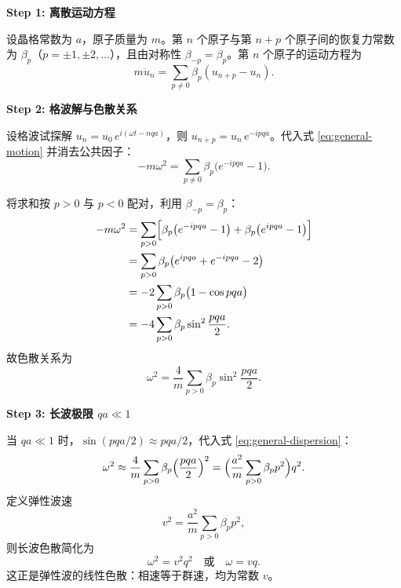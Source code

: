\begin{derivationbox}[标准解题过程]
\textbf{Step 1: 离散运动方程}

设晶格常数为 $a$，原子质量为 $m$。第 $n$ 个原子与第 $n+p$ 个原子间的恢复力常数为 $\beta_p$（$p=\pm1,\pm2,\dots$），且由对称性 $\beta_{-p}=\beta_p$。第 $n$ 个原子的运动方程为
\begin{equation}
m\ddot u_n = \sum_{p\neq0}\beta_p(u_{n+p}-u_n).
\label{eq:general-motion}
\end{equation}

\textbf{Step 2: 格波解与色散关系}

设格波试探解 $u_n=u_0\,e^{i(\omega t-nqa)}$，则 $u_{n+p}=u_n\,e^{-ipqa}$。代入式 \eqref{eq:general-motion} 并消去公共因子：
\begin{equation}
-m\omega^2 = \sum_{p\neq0}\beta_p\bigl(e^{-ipqa}-1\bigr).
\end{equation}

将求和按 $p>0$ 与 $p<0$ 配对，利用 $\beta_{-p}=\beta_p$：
\begin{align}
-m\omega^2 &= \sum_{p>0}\Bigl[\beta_p\bigl(e^{-ipqa}-1\bigr)+\beta_p\bigl(e^{ipqa}-1\bigr)\Bigr] \nonumber\\
&= \sum_{p>0}\beta_p\bigl(e^{ipqa}+e^{-ipqa}-2\bigr) \nonumber\\
&= -2\sum_{p>0}\beta_p\bigl(1-\cos pqa\bigr) \nonumber\\
&= -4\sum_{p>0}\beta_p\sin^2\frac{pqa}{2}.
\end{align}
故色散关系为
\begin{equation}
\boxed{\omega^2 = \frac{4}{m}\sum_{p>0}\beta_p\sin^2\frac{pqa}{2}.}
\label{eq:general-dispersion}
\end{equation}

\textbf{Step 3: 长波极限 $qa\ll1$}

当 $qa\ll1$ 时，$\sin(pqa/2)\approx pqa/2$，代入式 \eqref{eq:general-dispersion}：
\begin{equation}
\omega^2 \approx \frac{4}{m}\sum_{p>0}\beta_p\Bigl(\frac{pqa}{2}\Bigr)^2 = \Bigl(\frac{a^2}{m}\sum_{p>0}\beta_p p^2\Bigr)q^2.
\end{equation}
定义弹性波速
\begin{equation}
\boxed{v^2 = \frac{a^2}{m}\sum_{p>0}\beta_p p^2,}
\label{eq:elastic-velocity}
\end{equation}
则长波色散简化为
\begin{equation}
\boxed{\omega^2 = v^2 q^2 \quad\text{或}\quad \omega = vq.}
\label{eq:linear-dispersion}
\end{equation}
这正是弹性波的线性色散：相速等于群速，均为常数 $v$。


\end{derivationbox}

